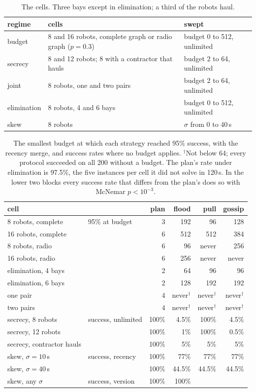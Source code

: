 \documentclass[11pt,a4paper]{article}
\theoremstyle{definition}
\begin{document}
\begin{table}[H]
\centering
\small
\begin{tabular}{@{}lll@{}}
\toprule
regime & cells & swept \\
\midrule
budget & 8 and 16 robots, complete graph or radio graph ($p = 0.3$) & budget 0 to 512, unlimited \\
secrecy & 8 and 12 robots; 8 with a contractor that hauls & budget 2 to 64, unlimited \\
joint & 8 robots, one and two pairs & budget 2 to 64, unlimited \\
elimination & 8 robots, 4 and 6 bays & budget 0 to 512, unlimited \\
skew & 8 robots & $\sigma$ from 0 to 40\,s \\
\bottomrule
\end{tabular}
\caption{The cells. Three bays except in elimination; a third of the robots haul.}
\label{tab:cells}
\end{table}

\begin{table}[H]
\centering
\small
\begin{tabular}{@{}llrrrr@{}}
\toprule
cell & & plan & flood & pull & gossip \\
\midrule
8 robots, complete & 95\% at budget & 3 & 192 & 96 & 128 \\
16 robots, complete & & 6 & 512 & 512 & 384 \\
8 robots, radio & & 6 & 96 & never & 256 \\
16 robots, radio & & 6 & 256 & never & never \\
elimination, 4 bays & & 2 & 64 & 96 & 96 \\
elimination, 6 bays & & 2 & 128 & 192 & 192 \\
one pair & & 4 & never$^\dagger$ & never$^\dagger$ & never$^\dagger$ \\
two pairs & & 4 & never$^\dagger$ & never$^\dagger$ & never$^\dagger$ \\
\midrule
secrecy, 8 robots & success, unlimited & 100\% & 4.5\% & 100\% & 4.5\% \\
secrecy, 12 robots & & 100\% & 1\% & 100\% & 0.5\% \\
secrecy, contractor hauls & & 100\% & 5\% & 5\% & 5\% \\
\midrule
skew, $\sigma = 10$\,s & success, recency & 100\% & 77\% & 77\% & 77\% \\
skew, $\sigma = 40$\,s & & 100\% & 44.5\% & 44.5\% & 44.5\% \\
skew, any $\sigma$ & success, version & 100\% & 100\% & & \\
\bottomrule
\end{tabular}
\caption{The smallest budget at which each strategy reached 95\% success, with the
recency merge, and success rates where no budget applies. $^\dagger$Not below 64;
every protocol succeeded on all 200 without a budget. The plan's rate under
elimination is 97.5\%, the five instances per cell it did not solve in 120\,s.
In the lower two blocks every success rate that differs from the plan's does so
with McNemar $p < 10^{-3}$.}
\label{tab:results}
\end{table}
\end{document}
